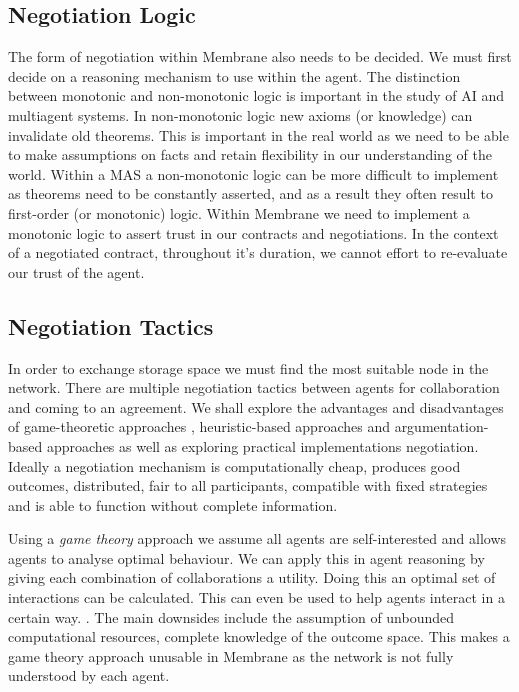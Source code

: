 \documentclass[a4paper, 11pt, twocolumn, twoside]{report}
\begin{document}
\subsection{Negotiation Logic}

The form of negotiation within Membrane also needs to be decided. We must first decide on a reasoning mechanism to use within the agent. The distinction between monotonic and non-monotonic logic is important in the study of AI and multiagent systems. In non-monotonic logic new axioms (or knowledge) can invalidate old theorems. \citep*{mcdermott1980non, antonelli2008non} This is important in the real world as we need to be able to make assumptions on facts and retain flexibility in our understanding of the world. Within a MAS a non-monotonic logic can be more difficult to implement as theorems need to be constantly asserted, and as a result they often result to first-order (or monotonic) logic. Within Membrane we need to implement a monotonic logic to assert trust in our contracts and negotiations. In the context of a negotiated contract, throughout it's duration, we cannot effort to re-evaluate our trust of the agent.

\subsection{Negotiation Tactics}

In order to exchange storage space we must find the most suitable node in the network. There are multiple negotiation tactics between agents for collaboration and coming to an agreement. \citep{beer1999negotiation} We shall explore the advantages and disadvantages of game-theoretic approaches \citep*{rosenschein1994rules, kraus2001strategic, sandholm2002algorithm}, heuristic-based approaches \citep*{faratin2000automated, fatima2002multi} and argumentation-based approaches \citep*{kraus1998reaching, jennings1998argumentation} as well as exploring practical implementations negotiation. Ideally a negotiation mechanism is computationally cheap, produces good outcomes, distributed, fair to all participants, compatible with fixed strategies and is able to function without complete information. \citep{rahwan2005interest}

Using a \emph{game theory} approach we assume all agents are self-interested and allows agents to analyse optimal behaviour. \citep{osborne1994course} We can apply this in agent reasoning by giving each combination of collaborations a utility. Doing this an optimal set of interactions can be calculated. This can even be used to help agents interact in a certain way. \citep{varian1995economic}. The main downsides include the assumption of unbounded computational resources, complete knowledge of the outcome space. \citep{rahwan2005interest} This makes a game theory approach unusable in Membrane as the network is not fully understood by each agent.
\end{document}
